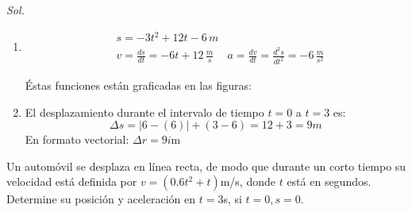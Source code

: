 \textit{ Sol. }

\begin{enumerate}
    \item \begin{align*}
        &s=-3t^2+12t-6\, m\\
        &v=\frac{ds}{dt}=-6t+12\, \frac{m}{s}
        &a=\frac{dv}{dt}=\frac{d^2s}{dt^2}=-6\, \frac{m}{s^2}
    \end{align*}
    
    Éstas funciones están graficadas en las figuras:
    
%    
%    
%    

    \item El desplazamiento durante el intervalo de tiempo $t=0$ a $t=3$ es: 
    \begin{equation*}
        \Delta s=\left\lvert 6-(6)\right\rvert +(3-6)=12+3=9m
    \end{equation*}
    En formato vectorial: $\Delta r=9i$m
\end{enumerate}

\begin{example}
    Un automóvil se desplaza en línea recta, de modo que durante un corto tiempo su velocidad está definida por $v=\left(0.6t^2+t\right)$m/s, donde $t$ está en segundos. Determine su posición y aceleración en $t=3$s, si $t=0,s=0$.
\end{example}

